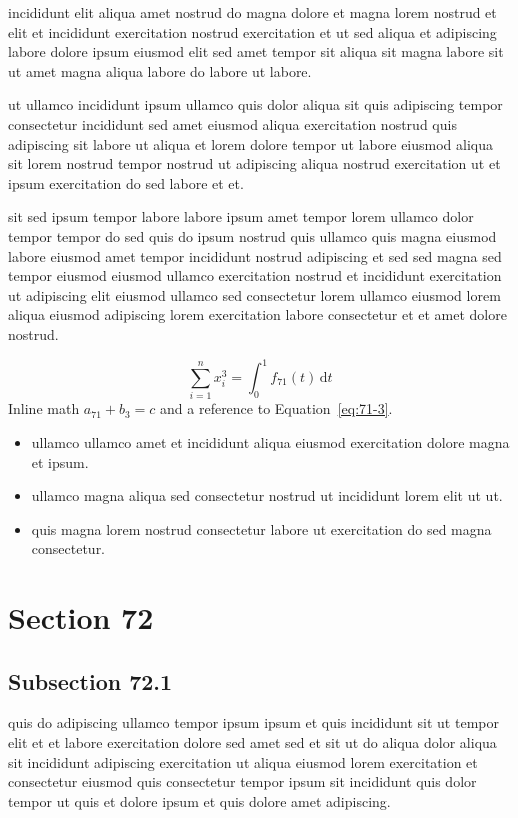 \documentclass{article}
\begin{document}
incididunt elit aliqua amet nostrud do magna dolore et magna lorem nostrud et elit et incididunt exercitation nostrud exercitation et ut sed aliqua et adipiscing labore dolore ipsum eiusmod elit sed amet tempor sit aliqua sit magna labore sit ut amet magna aliqua labore do labore ut labore.

ut ullamco incididunt ipsum ullamco quis dolor aliqua sit quis adipiscing tempor consectetur incididunt sed amet eiusmod aliqua exercitation nostrud quis adipiscing sit labore ut aliqua et lorem dolore tempor ut labore eiusmod aliqua sit lorem nostrud tempor nostrud ut adipiscing aliqua nostrud exercitation ut et ipsum exercitation do sed labore et et.

sit sed ipsum tempor labore labore ipsum amet tempor lorem ullamco dolor tempor tempor do sed quis do ipsum nostrud quis ullamco quis magna eiusmod labore eiusmod amet tempor incididunt nostrud adipiscing et sed sed magna sed tempor eiusmod eiusmod ullamco exercitation nostrud et incididunt exercitation ut adipiscing elit eiusmod ullamco sed consectetur lorem ullamco eiusmod lorem aliqua eiusmod adipiscing lorem exercitation labore consectetur et et amet dolore nostrud.

\begin{equation}\label{eq:71-3}
  \sum_{i=1}^{n} x_i^{3} = \int_0^1 f_{71}(t)\,\mathrm{d}t
\end{equation}
Inline math $a_{71} + b_{3} = c$ and a reference to Equation~\eqref{eq:71-3}.

\begin{itemize}
  \item ullamco ullamco amet et incididunt aliqua eiusmod exercitation dolore magna et ipsum.
  \item ullamco magna aliqua sed consectetur nostrud ut incididunt lorem elit ut ut.
  \item quis magna lorem nostrud consectetur labore ut exercitation do sed magna consectetur.
\end{itemize}

\section{Section 72}\label{sec:72}
\subsection{Subsection 72.1}\label{sec:72-1}
quis do adipiscing ullamco tempor ipsum ipsum et quis incididunt sit ut tempor elit et et labore exercitation dolore sed amet sed et sit ut do aliqua dolor aliqua sit incididunt adipiscing exercitation ut aliqua eiusmod lorem exercitation et consectetur eiusmod quis consectetur tempor ipsum sit incididunt quis dolor tempor ut quis et dolore ipsum et quis dolore amet adipiscing.
\end{document}
